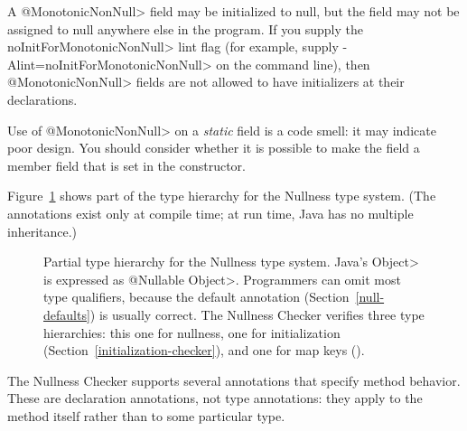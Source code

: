 \begin{description}
  A \<@MonotonicNonNull> field may be initialized to null, but the
  field may not be assigned to null anywhere else in the program.  If you
  supply the \<noInitForMonotonicNonNull> lint flag (for example, supply
  \<-Alint=noInitForMonotonicNonNull> on the command line), then
  \<@MonotonicNonNull> fields are not allowed to have initializers at their
  declarations.

  Use of \<@MonotonicNonNull> on a \emph{static} field is a code smell:  it may
  indicate poor design.  You should consider whether it is possible to make
  the field a member field that is set in the constructor.

\end{description}

Figure~\ref{fig-nullness-hierarchy} shows part of the type hierarchy for the
Nullness type system.
(The annotations exist only at compile time; at run time, Java has no
multiple inheritance.)

\begin{figure}
\caption{Partial type hierarchy for the Nullness type system.
Java's \<Object> is expressed as \<@Nullable Object>.  Programmers can omit
most type qualifiers, because the default annotation
(Section~\ref{null-defaults}) is usually correct.
The Nullness Checker verifies three type hierarchies:  this one for
nullness, one for initialization (Section~\ref{initialization-checker}),
and one for map keys ().}
\label{fig-nullness-hierarchy}
\end{figure}



The Nullness Checker supports several annotations that specify method
behavior.  These are declaration annotations, not type annotations:  they
apply to the method itself rather than to some particular type.


